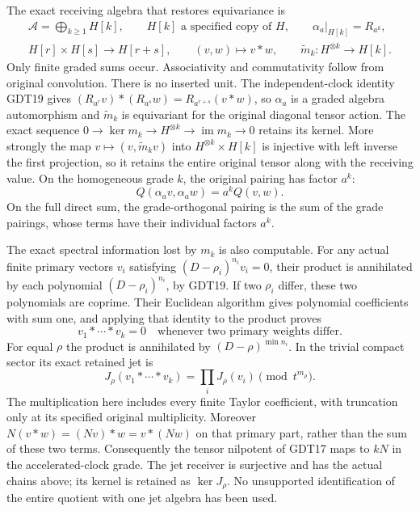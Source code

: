 The exact receiving algebra that restores equivariance is
\begin{equation}\tag{GDT20}
 \begin{gathered}
 \mathcal A=\bigoplus_{k\ge1}H[k],\qquad
 H[k]\text{ a specified copy of }H,\qquad
 \alpha_a|_{H[k]}=R_{a^k},\\
 H[r]\times H[s]\longrightarrow H[r+s],\qquad
 (v,w)\longmapsto v*w,\qquad
 \widetilde m_k:H^{\otimes k}\longrightarrow H[k].
 \end{gathered}
\end{equation}
Only finite graded sums occur.
Associativity and commutativity follow from original
convolution. There is no inserted unit.
The independent-clock identity GDT19 gives
$(R_{a^r}v)*(R_{a^s}w)=R_{a^{r+s}}(v*w)$,
so $\alpha_a$ is a graded algebra automorphism and
$\widetilde m_k$ is equivariant for the original
diagonal tensor action. The exact sequence
$0\to\ker m_k\to H^{\otimes k}\to\operatorname{im}m_k\to0$
retains its kernel. More strongly the map
$v\mapsto(v,\widetilde m_kv)$ into
$H^{\otimes k}\times H[k]$ is injective with left
inverse the first projection, so it retains the
entire original tensor along with the receiving
value.
On the homogeneous grade $k$, the original pairing
has factor $a^k$:
\[
 Q(\alpha_av,\alpha_aw)=a^kQ(v,w).
\]
On the full direct sum, the grade-orthogonal pairing
is the sum of the grade pairings, whose terms have
their individual factors $a^k$.

The exact spectral information lost by $m_k$ is
also computable. For any actual finite primary
vectors $v_i$ satisfying
$(D-\rho_i)^{n_i}v_i=0$, their product is annihilated
by each polynomial $(D-\rho_i)^{n_i}$, by GDT19.
If two $\rho_i$ differ, these two polynomials are
coprime. Their Euclidean algorithm gives polynomial
coefficients with sum one, and applying that
identity to the product proves
\begin{equation}\tag{GDT21}
 v_1*\cdots*v_k=0
       \quad\text{whenever two primary weights differ}.
\end{equation}
For equal $\rho$ the product is annihilated by
$(D-\rho)^{\min n_i}$. In the trivial compact
sector its exact retained jet is
\begin{equation}\tag{GDT22}
 J_\rho(v_1*\cdots*v_k)=\prod_iJ_\rho(v_i)
             \pmod{t^{m_\rho}} .
\end{equation}
The multiplication here includes every finite
Taylor coefficient, with truncation only at its
specified original multiplicity.
Moreover $N(v*w)=(Nv)*w=v*(Nw)$ on that primary
part, rather than the sum of these two terms.
Consequently the tensor nilpotent of GDT17 maps to
$kN$ in the accelerated-clock grade.
The jet receiver is surjective and has the actual
chains above; its kernel is retained as
$\ker J_\rho$. No unsupported identification of
the entire quotient with one jet algebra has
been used.

